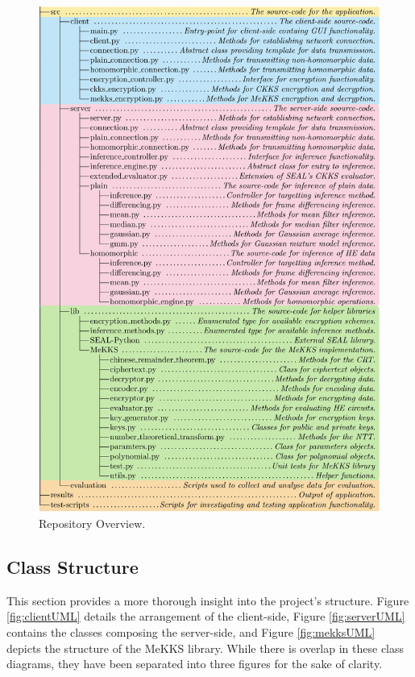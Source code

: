 \begin{figure}[htp]     
    \includegraphics[scale=0.97]{figures/repositoryOverview}
    \caption[Repository Overview]{Repository Overview.}
    \label{fig:filetree}
\end{figure}
\setlength{\leftskip}{0cm}
\subsection{Class Structure}
\setlength{\leftskip}{0.5cm}
\indent \indent
This section provides a more thorough insight into the project's structure. Figure \ref{fig:clientUML} details the arrangement of the client-side, Figure \ref{fig:serverUML} contains the classes composing the server-side, and Figure \ref{fig:mekksUML} depicts the structure of the MeKKS library. While there is overlap in these class diagrams, they have been separated into three figures for the sake of clarity.

